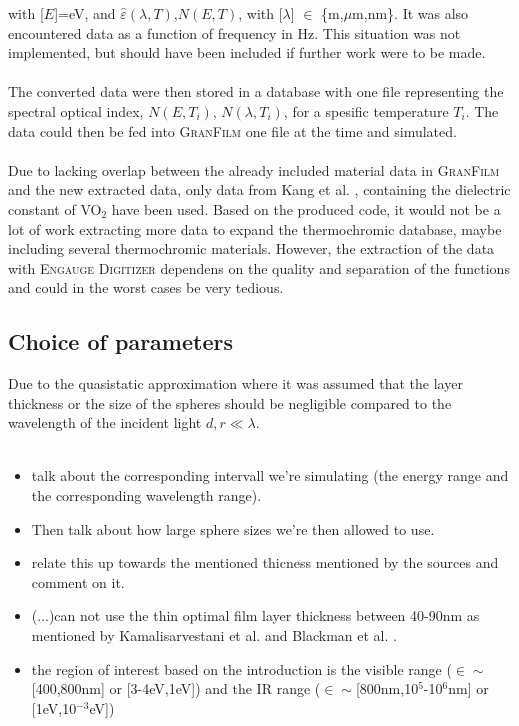 with [$E$]=eV, and $\widehat\varepsilon(\lambda,T)$,$N(E,T)$, with [$\lambda$] $\in$ \{m,$\mu$m,nm\}. 
It was also encountered data as a function of frequency in Hz. This situation was not implemented, 
but should have been included if further work were to be made. 
\\
\\
The converted data were then stored in a database with one file representing the spectral 
optical index, $N(E,T_i)$, $N(\lambda,T_i)$, for a spesific temperature $T_i$. The data could then 
be fed into \textsc{GranFilm} one file at the time and simulated. 
\\
\\
Due to lacking overlap between the already included material data in \textsc{GranFilm} and the new extracted
data, only data from Kang et al. \cite[p.~3]{Kang2012}, containing the dielectric constant of 
VO$_2$ have been used. 
Based on the produced code, it would not be a lot of work extracting more data 
to expand the thermochromic database, maybe including several thermochromic materials. However, the
extraction of the data with \textsc{Engauge Digitizer} dependens on the quality and 
separation of the functions and could in the worst cases be very tedious.

\subsection{Choice of parameters}
Due to the quasistatic approximation where it was assumed that the layer thickness or the size
of the spheres should be negligible compared to the wavelength of the incident light $d,r \ll \lambda$.
\\
\\

\begin{itemize}
   \item talk about the corresponding intervall we're simulating (the energy range and the corresponding
      wavelength range).
   \item Then talk about how large sphere sizes we're then allowed to use.
   \item relate this up towards the mentioned thicness mentioned by the sources and comment on it.
   \item (...)can not use the thin optimal film layer thickness between 40-90nm as mentioned by 
      Kamalisarvestani et al. \cite{Kamalisarvestani2013} and Blackman et al. \cite{Blackman2009}.
   \item the region of interest based on the introduction is the visible range ($\in \sim $[400,800nm] 
      or [3-4eV,1eV]) and the IR range ($\in \sim $[800nm,10$^5$-10$^6$nm] or [1eV,10$^{-3}$eV]) 
      \cite[p.~11]{Smith}
\end{itemize}


